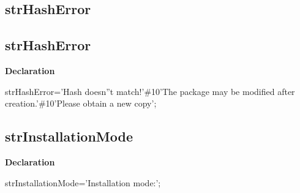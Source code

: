 \documentclass{report}
\newif\ifpdf
\begin{document}
\subsection*{\large{\textbf{strHashError}}\normalsize\hspace{1ex}\hrulefill}
\else
\subsection*{strHashError}
\fi
\label{trstrings-strHashError}
\begin{list}{}{
\setlength{\itemindent}{0cm}
\setlength{\listparindent}{0cm}
\setlength{\leftmargin}{\evensidemargin}
\addtolength{\leftmargin}{\tmplength}
\settowidth{\labelsep}{X}
\addtolength{\leftmargin}{\labelsep}
\setlength{\labelwidth}{\tmplength}
}
\item[\textbf{Declaration}\hfill]
\ifpdf
\begin{flushleft}
\fi
\begin{ttfamily}
strHashError='Hash doesn''t match!'{\#}10'The package may be modified after creation.'{\#}10'Please obtain a new copy';\end{ttfamily}

\ifpdf
\end{flushleft}
\fi

\end{list}
\ifpdf
\subsection*{\large{\textbf{strInstallationMode}}\normalsize\hspace{1ex}\hrulefill}
\else
\subsection*{strInstallationMode}
\fi
\label{trstrings-strInstallationMode}
\begin{list}{}{
\setlength{\itemindent}{0cm}
\setlength{\listparindent}{0cm}
\setlength{\leftmargin}{\evensidemargin}
\addtolength{\leftmargin}{\tmplength}
\settowidth{\labelsep}{X}
\addtolength{\leftmargin}{\labelsep}
\setlength{\labelwidth}{\tmplength}
}
\item[\textbf{Declaration}\hfill]
\ifpdf
\begin{flushleft}
\fi
\begin{ttfamily}
strInstallationMode='Installation mode:';\end{ttfamily}

\ifpdf
\end{flushleft}
\fi

\end{list}
\ifpdf
\end{document}
